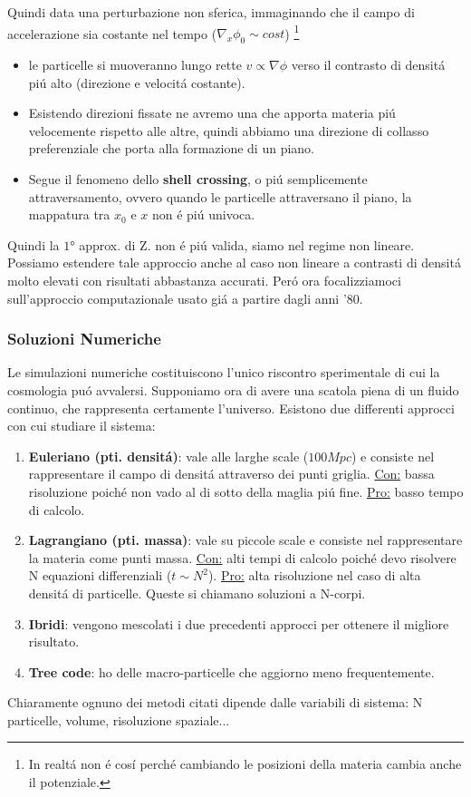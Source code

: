 \documentclass[12pt, a4paper]{article}
\begin{document}
Quindi data una perturbazione non sferica, immaginando che il campo di accelerazione sia costante nel tempo ($\nabla_x \phi_0 \sim cost$) \footnote{In realt\'{a} non \'{e} cos\'{i} perch\'{e} cambiando le posizioni della materia cambia anche il potenziale.} 
\begin{itemize}
\item le particelle si muoveranno lungo rette $v\propto \nabla\phi$ verso il contrasto di densit\'{a} pi\'{u} alto (direzione e velocit\'{a} costante). 
\item Esistendo direzioni fissate ne avremo una che apporta materia pi\'{u} velocemente rispetto alle altre, quindi abbiamo una direzione di collasso preferenziale che porta alla formazione di un piano.
\item Segue il fenomeno dello \textbf{shell crossing}, o pi\'{u} semplicemente attraversamento, ovvero quando le particelle attraversano il piano, la mappatura tra $x_0$ e $x$ non \'{e} pi\'{u} univoca.
\end{itemize}
Quindi la $1°$ approx. di Z. non \'{e} pi\'{u} valida, siamo nel regime non lineare. Possiamo estendere tale approccio anche al caso non lineare a contrasti di densit\'{a} molto elevati con risultati abbastanza accurati. Per\'{o} ora focalizziamoci sull'approccio computazionale usato gi\'{a} a partire dagli anni '80.
\subsubsection{Soluzioni Numeriche}
Le simulazioni numeriche costituiscono l'unico riscontro sperimentale di cui la cosmologia pu\'{o} avvalersi. Supponiamo ora  di avere una scatola piena di un fluido continuo, che rappresenta certamente l'universo. Esistono due differenti approcci con cui studiare il sistema:
\begin{enumerate}
\item \textbf{Euleriano (pti. densit\'{a})}: vale alle larghe scale ($100 Mpc$) e consiste nel rappresentare il campo di densit\'{a} attraverso dei punti griglia. \underline{Con:} bassa risoluzione poich\'{e} non vado al di sotto della maglia pi\'{u} fine. \underline{Pro:} basso tempo di calcolo. 
\item \textbf{Lagrangiano (pti. massa)}: vale su piccole scale e consiste nel rappresentare la materia come punti massa. \underline{Con:} alti tempi di calcolo poich\'{e} devo risolvere N equazioni differenziali ($t\sim N^2$). \underline{Pro:} alta risoluzione nel caso di alta densit\'{a} di particelle. Queste si chiamano soluzioni a N-corpi.
\item \textbf{Ibridi}: vengono mescolati i due precedenti approcci per ottenere il migliore risultato.
\item \textbf{Tree code}: ho delle macro-particelle che aggiorno meno frequentemente.
\end{enumerate}
Chiaramente ognuno dei metodi citati dipende dalle variabili di sistema: N particelle, volume, risoluzione spaziale...
\end{document}
